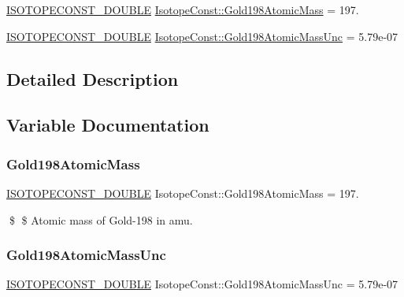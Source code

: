 \begin{DoxyCompactItemize}
\item 
\mbox{\hyperlink{group___isotope_const-_macros_ga8f45a7272ce02c0b4c65c44636ed719a}{I\+S\+O\+T\+O\+P\+E\+C\+O\+N\+S\+T\+\_\+\+D\+O\+U\+B\+LE}} \mbox{\hyperlink{group___isotope_const-_gold-_au198_ga3a5b4aa36e6bb24e1a5e8017e7e2818a}{Isotope\+Const\+::\+Gold198\+Atomic\+Mass}} = 197.
\item 
\mbox{\hyperlink{group___isotope_const-_macros_ga8f45a7272ce02c0b4c65c44636ed719a}{I\+S\+O\+T\+O\+P\+E\+C\+O\+N\+S\+T\+\_\+\+D\+O\+U\+B\+LE}} \mbox{\hyperlink{group___isotope_const-_gold-_au198_ga85c83da5eee407bb78ef8d23694a1d0c}{Isotope\+Const\+::\+Gold198\+Atomic\+Mass\+Unc}} = 5.\+79e-\/07
\end{DoxyCompactItemize}


\subsection{Detailed Description}


\subsection{Variable Documentation}
\mbox{\label{group___isotope_const-_gold-_au198_ga3a5b4aa36e6bb24e1a5e8017e7e2818a}} 
\subsubsection{\texorpdfstring{Gold198\+Atomic\+Mass}{Gold198AtomicMass}}
{\footnotesize\ttfamily \mbox{\hyperlink{group___isotope_const-_macros_ga8f45a7272ce02c0b4c65c44636ed719a}{I\+S\+O\+T\+O\+P\+E\+C\+O\+N\+S\+T\+\_\+\+D\+O\+U\+B\+LE}} Isotope\+Const\+::\+Gold198\+Atomic\+Mass = 197.}

\$ \$ Atomic mass of Gold-\/198 in amu. \mbox{\label{group___isotope_const-_gold-_au198_ga85c83da5eee407bb78ef8d23694a1d0c}} 
\subsubsection{\texorpdfstring{Gold198\+Atomic\+Mass\+Unc}{Gold198AtomicMassUnc}}
{\footnotesize\ttfamily \mbox{\hyperlink{group___isotope_const-_macros_ga8f45a7272ce02c0b4c65c44636ed719a}{I\+S\+O\+T\+O\+P\+E\+C\+O\+N\+S\+T\+\_\+\+D\+O\+U\+B\+LE}} Isotope\+Const\+::\+Gold198\+Atomic\+Mass\+Unc = 5.\+79e-\/07}

